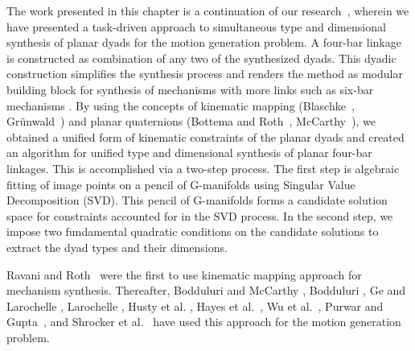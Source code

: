 The work presented in this chapter is a continuation of our research~\cite{generalfitting-JCISE,motiongen-JMR,ge2012novel}, wherein we have presented a task-driven approach to simultaneous type and dimensional synthesis of planar dyads for the motion generation problem.
A four-bar linkage is constructed as combination of any two of the synthesized dyads.
This dyadic construction simplifies the synthesis process and renders the method as modular building block for synthesis of mechanisms with more links such as six-bar mechanisms \cite{generalfitting-JCISE}.
By using the concepts of kinematic mapping (Blaschke~\cite{Blaschke1911}, Gr{\"u}nwald~\cite{Grunwald1911}) and planar quaternions (Bottema and Roth~\cite{Bottema}, McCarthy~\cite{McCarthy90}), we obtained a unified form of kinematic constraints of the planar dyads and created an algorithm for unified type and dimensional synthesis of planar four-bar linkages. This is accomplished via a two-step process.
The first step is algebraic fitting of image points on a pencil of G-manifolds using Singular Value Decomposition (SVD).
This pencil of G-manifolds forms a candidate solution space for constraints accounted for in the SVD process.
In the second step, we impose two fundamental quadratic conditions on the candidate solutions to extract the dyad types and their dimensions.

Ravani and Roth~\cite{ravani83,ravani84} were the first to use kinematic mapping approach for mechanism synthesis.
Thereafter, Bodduluri and McCarthy \cite{Bodduluri92}, Bodduluri \cite{Bodduluri},  Ge and Larochelle \cite{GeLarochelle99}, Larochelle \cite{Larochelle, Larochelle1996}, Husty et al. \cite{Husty2007}, Hayes et al.~\cite{Hayes2004, Hayes2011}, Wu et al.~\cite{WuPurwarGe2010}, Purwar and Gupta~\cite{PurwarGupta2011}, and Shrocker et al.~\cite{schroker-planar} have used this approach for the motion generation problem.

